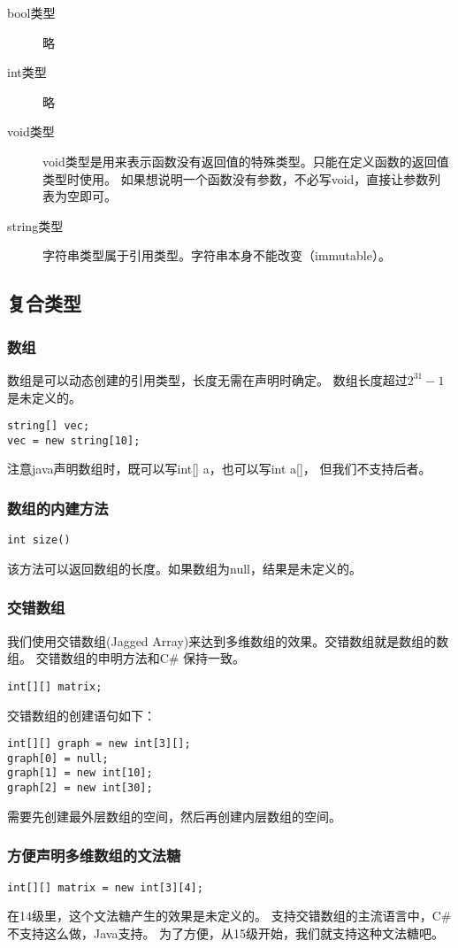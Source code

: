 \documentclass[twocolumn]{article}
\begin{document}
\begin{description}
\item[bool类型] 略 
\item[int类型] 略
\item[void类型] void类型是用来表示函数没有返回值的特殊类型。只能在定义函数的返回值类型时使用。
如果想说明一个函数没有参数，不必写void，直接让参数列表为空即可。
\item[string类型] 字符串类型属于引用类型。字符串本身不能改变（immutable）。
\end{description}

\subsection{复合类型}

\subsubsection{数组}
数组是可以动态创建的引用类型，长度无需在声明时确定。
数组长度超过$2^{31}-1$是未定义的。
\begin{verbatim}
string[] vec;
vec = new string[10];
\end{verbatim}
注意java声明数组时，既可以写int[] a，也可以写int a[]，
但我们不支持后者。
\subsubsection{数组的内建方法}
\begin{verbatim}
int size()
\end{verbatim}
该方法可以返回数组的长度。如果数组为null，结果是未定义的。

\subsubsection{交错数组}
我们使用交错数组(Jagged Array)来达到多维数组的效果。交错数组就是数组的数组。
交错数组的申明方法和C\# 保持一致。
\begin{verbatim}
int[][] matrix;
\end{verbatim}
交错数组的创建语句如下：
\begin{verbatim}
int[][] graph = new int[3][];
graph[0] = null;
graph[1] = new int[10];
graph[2] = new int[30];
\end{verbatim}
需要先创建最外层数组的空间，然后再创建内层数组的空间。
\subsubsection{方便声明多维数组的文法糖}
\begin{verbatim}
int[][] matrix = new int[3][4];
\end{verbatim}
在14级里，这个文法糖产生的效果是未定义的。
支持交错数组的主流语言中，C\#不支持这么做，Java支持。
为了方便，从15级开始，我们就支持这种文法糖吧。
\end{document}
